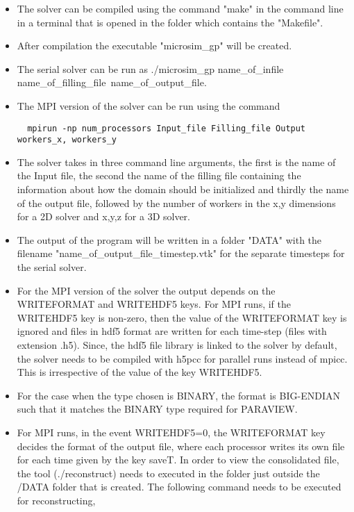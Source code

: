 \documentclass[a4paper,10pt]{article}
\begin{document}
\begin{itemize}
 \item The solver can be compiled using the command "make" in the command line in a terminal that is opened in the folder which contains the "Makefile".
 \item After compilation the executable "microsim\_gp" will be created. 
 \item The serial solver can be run as ./microsim\_gp name\_of\_infile name\_of\_filling\_file\ name\_of\_output\_file.
 \item The MPI version of the solver can be run using the command
 \begin{lstlisting}
  mpirun -np num_processors Input_file Filling_file Output workers_x, workers_y
 \end{lstlisting}
 \item The solver takes in three command line arguments, the first is the name of the Input file, 
 the second the name of the filling file containing the information about how the domain 
 should be initialized and thirdly the name of the output file, followed by the number of workers in the 
 x,y dimensions for a 2D solver and x,y,z for a 3D solver. 
 \item The output of the program will be written in a folder "DATA" with the filename 
 "name\_of\_output\_file\_timestep.vtk" for the separate timesteps for the serial solver. 
 \item For the MPI version of the solver the output depends on the WRITEFORMAT and WRITEHDF5 keys.
 For MPI runs, if the WRITEHDF5 key is non-zero, then the value of the WRITEFORMAT key is ignored and files in hdf5 format are written for each time-step
 (files with extension .h5). Since, the hdf5 file library is linked to the solver by default, the solver needs 
 to be compiled with h5pcc for parallel runs instead of mpicc. This is irrespective of the value of the key WRITEHDF5.
 \item For the case when the type chosen is BINARY, the format is BIG-ENDIAN such that it matches the BINARY 
 type required for PARAVIEW.
 \item For MPI runs, in the event WRITEHDF5=0, the WRITEFORMAT key decides the format of the output file, where 
 each processor writes its own file for each time given by the key saveT. In order to view the consolidated file, 
 the tool (./reconstruct) needs to executed in the folder just outside the /DATA folder that is created. The following 
 command needs to be executed for reconstructing,
 \begin{lstlisting}

\end{lstlisting}
\end{itemize}
\end{document}
